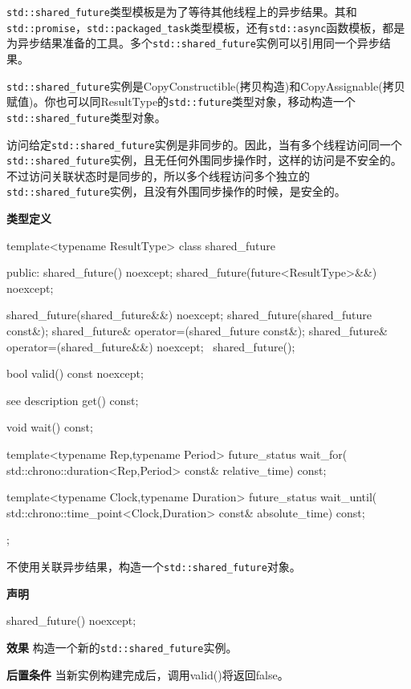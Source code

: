 \texttt{std::shared\_future}类型模板是为了等待其他线程上的异步结果。其和\texttt{std::promise}，\texttt{std::packaged\_task}类型模板，还有\texttt{std::async}函数模板，都是为异步结果准备的工具。多个\texttt{std::shared\_future}实例可以引用同一个异步结果。

\texttt{std::shared\_future}实例是CopyConstructible(拷贝构造)和CopyAssignable(拷贝赋值)。你也可以同ResultType的\texttt{std::future}类型对象，移动构造一个\texttt{std::shared\_future}类型对象。

访问给定\texttt{std::shared\_future}实例是非同步的。因此，当有多个线程访问同一个\texttt{std::shared\_future}实例，且无任何外围同步操作时，这样的访问是不安全的。不过访问关联状态时是同步的，所以多个线程访问多个独立的\texttt{std::shared\_future}实例，且没有外围同步操作的时候，是安全的。

\textbf{类型定义}

\begin{cpp}
template<typename ResultType>
class shared_future
{
public:
  shared_future() noexcept;
  shared_future(future<ResultType>&&) noexcept;

  shared_future(shared_future&&) noexcept;
  shared_future(shared_future const&);
  shared_future& operator=(shared_future const&);
  shared_future& operator=(shared_future&&) noexcept;
  ~shared_future();

  bool valid() const noexcept;

  see description get() const;

  void wait() const;

  template<typename Rep,typename Period>
  future_status wait_for(
     std::chrono::duration<Rep,Period> const& relative_time) const;

  template<typename Clock,typename Duration>
  future_status wait_until(
     std::chrono::time_point<Clock,Duration> const& absolute_time)
    const;
};
\end{cpp}


不使用关联异步结果，构造一个\texttt{std::shared\_future}对象。

\textbf{声明}

\begin{cpp}
shared_future() noexcept;
\end{cpp}

\textbf{效果}
构造一个新的\texttt{std::shared\_future}实例。

\textbf{后置条件}
当新实例构建完成后，调用valid()将返回false。

